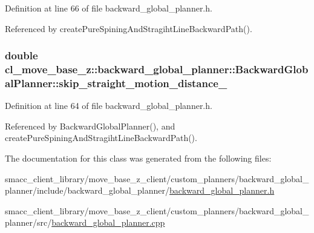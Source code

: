 Definition at line 66 of file backward\+\_\+global\+\_\+planner.\+h.



Referenced by create\+Pure\+Spining\+And\+Stragiht\+Line\+Backward\+Path().

\subsubsection[{\texorpdfstring{skip\+\_\+straight\+\_\+motion\+\_\+distance\+\_\+}{skip_straight_motion_distance_}}]{\setlength{\rightskip}{0pt plus 5cm}double cl\+\_\+move\+\_\+base\+\_\+z\+::backward\+\_\+global\+\_\+planner\+::\+Backward\+Global\+Planner\+::skip\+\_\+straight\+\_\+motion\+\_\+distance\+\_\+\hspace{0.3cm}{\ttfamily [private]}}\hypertarget{classcl__move__base__z_1_1backward__global__planner_1_1BackwardGlobalPlanner_a045290b931b816b84ced2cfb6c39fcce}{}\label{classcl__move__base__z_1_1backward__global__planner_1_1BackwardGlobalPlanner_a045290b931b816b84ced2cfb6c39fcce}


Definition at line 64 of file backward\+\_\+global\+\_\+planner.\+h.



Referenced by Backward\+Global\+Planner(), and create\+Pure\+Spining\+And\+Stragiht\+Line\+Backward\+Path().



The documentation for this class was generated from the following files\+:\begin{DoxyCompactItemize}
\item 
smacc\+\_\+client\+\_\+library/move\+\_\+base\+\_\+z\+\_\+client/custom\+\_\+planners/backward\+\_\+global\+\_\+planner/include/backward\+\_\+global\+\_\+planner/\hyperlink{backward__global__planner_8h}{backward\+\_\+global\+\_\+planner.\+h}\item 
smacc\+\_\+client\+\_\+library/move\+\_\+base\+\_\+z\+\_\+client/custom\+\_\+planners/backward\+\_\+global\+\_\+planner/src/\hyperlink{backward__global__planner_8cpp}{backward\+\_\+global\+\_\+planner.\+cpp}\end{DoxyCompactItemize}
